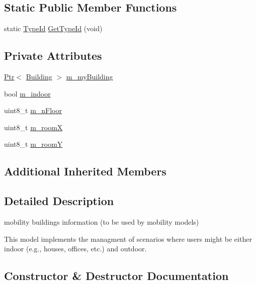 \subsection*{Static Public Member Functions}
\begin{DoxyCompactItemize}
\item 
static \hyperlink{classns3_1_1TypeId}{Type\+Id} \hyperlink{classns3_1_1MobilityBuildingInfo_a3883968110a71e266417d3d708f4c539}{Get\+Type\+Id} (void)
\end{DoxyCompactItemize}
\subsection*{Private Attributes}
\begin{DoxyCompactItemize}
\item 
\hyperlink{classns3_1_1Ptr}{Ptr}$<$ \hyperlink{classns3_1_1Building}{Building} $>$ \hyperlink{classns3_1_1MobilityBuildingInfo_a1ec75917b98d059863ed1d1adcb9b624}{m\+\_\+my\+Building}
\item 
bool \hyperlink{classns3_1_1MobilityBuildingInfo_a38efe70a9d3df1cff6056c5efe6f194b}{m\+\_\+indoor}
\item 
uint8\+\_\+t \hyperlink{classns3_1_1MobilityBuildingInfo_ac263d5a751fc7a3ac41bd1a412a9c119}{m\+\_\+n\+Floor}
\item 
uint8\+\_\+t \hyperlink{classns3_1_1MobilityBuildingInfo_a16d68b8e003aa4754b297c79eb7fdbea}{m\+\_\+roomX}
\item 
uint8\+\_\+t \hyperlink{classns3_1_1MobilityBuildingInfo_a221bc1e6f3d991a2397c43360a1e1a21}{m\+\_\+roomY}
\end{DoxyCompactItemize}
\subsection*{Additional Inherited Members}


\subsection{Detailed Description}
mobility buildings information (to be used by mobility models) 

This model implements the managment of scenarios where users might be either indoor (e.\+g., houses, offices, etc.) and outdoor. 

\subsection{Constructor \& Destructor Documentation}
